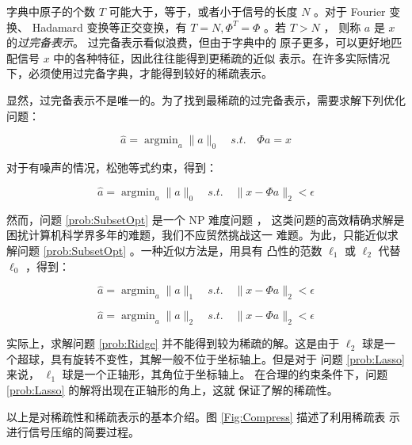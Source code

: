 字典中原子的个数 $T$ 可能大于，等于，或者小于信号的长度 $N$ 。对于 Fourier
变换、 Hadamard 变换等正交变换，有 $T = N, \Phi^T = \Phi$ 。若 $T > N$ ，
则称 $a$ 是 $x$ 的\emph{过完备表示}。 过完备表示看似浪费，但由于字典中的
原子更多，可以更好地匹配信号 $x$ 中的各种特征，因此往往能得到更稀疏的近似
表示。在许多实际情况下，必须使用过完备字典，才能得到较好的稀疏表示。

显然，过完备表示不是唯一的。为了找到最稀疏的过完备表示，需要求解下列优化
问题：
\begin{problem}
\begin{equation}
\hat a = \mathop{\arg\min}_a \|a\|_0 \quad s.t. \quad \Phi a = x
\end{equation}
\end{problem}
对于有噪声的情况，松弛等式约束，得到：
\begin{problem}[子集最优化问题] \label{prob:SubsetOpt}
\begin{equation}
\hat a = \mathop{\arg\min}_a  \|a\|_0 \quad s.t. \quad \|x - \Phi a\|_2 < \epsilon
\end{equation}
\end{problem}
然而，问题 \ref{prob:SubsetOpt} 是一个 NP 难度问题 \cite{GJ79} \cite{SubsetOptNPC}，
这类问题的高效精确求解是困扰计算机科学界多年的难题，我们不应贸然挑战这一
难题。为此，只能近似求解问题 \ref{prob:SubsetOpt} 。一种近似方法是，用具有
凸性的范数 $\ell_1$ 或 $\ell_2$ 代替 $\ell_0$ ，得到：
\begin{problem} \label{prob:Lasso}
\begin{equation} \label{eqn:Lasso}
\hat a = \mathop{\arg\min}_a \|a\|_1 \quad s.t. \quad \|x - \Phi a\|_2 < \epsilon
\end{equation}
\end{problem}
\begin{problem}[岭回归问题] \label{prob:Ridge}
\begin{equation}
\hat a = \mathop{\arg\min}_a \|a\|_2 \quad s.t. \quad \|x - \Phi a\|_2 < \epsilon
\end{equation}
\end{problem}
实际上，求解问题 \ref{prob:Ridge} 并不能得到较为稀疏的解。这是由于
$\ell_2$ 球是一个超球，具有旋转不变性，其解一般不位于坐标轴上。但是对于
问题 \ref{prob:Lasso} 来说， $\ell_1$ 球是一个正轴形，其角位于坐标轴上。
在合理的约束条件下，问题 \ref{prob:Lasso} 的解将出现在正轴形的角上，这就
保证了解的稀疏性。

以上是对稀疏性和稀疏表示的基本介绍。图 \ref{Fig:Compress} 描述了利用稀疏表
示进行信号压缩的简要过程。

